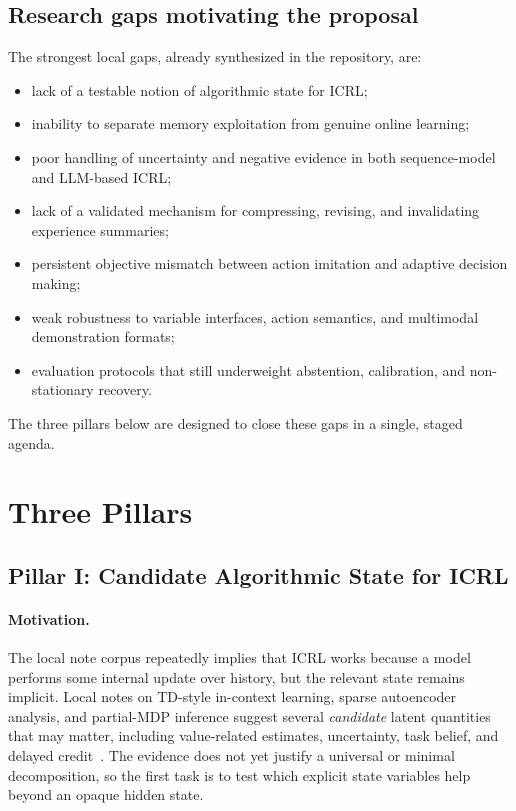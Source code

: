 \documentclass[10pt,twocolumn,letterpaper]{article}
\begin{document}
\subsection{Research gaps motivating the proposal}
The strongest local gaps, already synthesized in the repository, are:
\begin{itemize}[leftmargin=1.2em]
\item lack of a testable notion of algorithmic state for ICRL;
\item inability to separate memory exploitation from genuine online learning;
\item poor handling of uncertainty and negative evidence in both sequence-model and LLM-based ICRL;
\item lack of a validated mechanism for compressing, revising, and invalidating experience summaries;
\item persistent objective mismatch between action imitation and adaptive decision making;
\item weak robustness to variable interfaces, action semantics, and multimodal demonstration formats;
\item evaluation protocols that still underweight abstention, calibration, and non-stationary recovery.
\end{itemize}

The three pillars below are designed to close these gaps in a single, staged agenda.

\section{Three Pillars}
\subsection{Pillar I: Candidate Algorithmic State for ICRL}
\paragraph{Motivation.}
The local note corpus repeatedly implies that ICRL works because a model performs some internal update over history, but the relevant state remains implicit. Local notes on TD-style in-context learning, sparse autoencoder analysis, and partial-MDP inference suggest several \emph{candidate} latent quantities that may matter, including value-related estimates, uncertainty, task belief, and delayed credit~\cite{wang2024td,demircan2024sae,jiang2023partialmdp}. The evidence does not yet justify a universal or minimal decomposition, so the first task is to test which explicit state variables help beyond an opaque hidden state.
\end{document}
